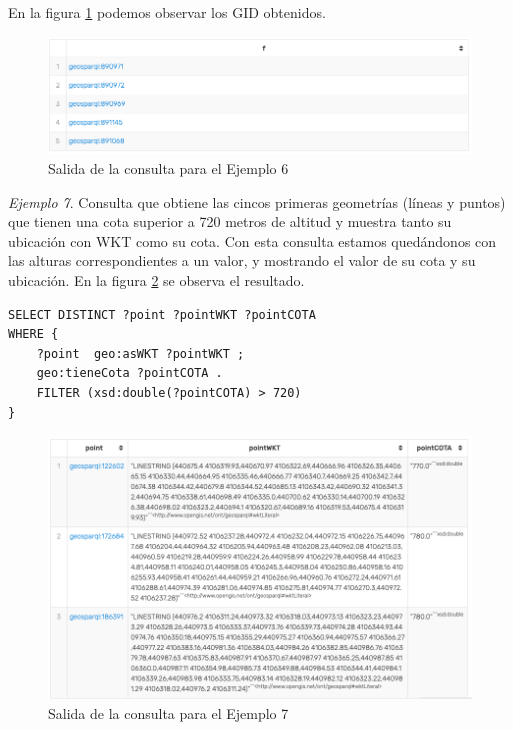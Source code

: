 En la figura \ref{fig:salida4} podemos observar los GID obtenidos.

\begin{figure}[H]
	\centering
	\includegraphics[width=1\linewidth]{imagenes/capitulo5/salida4}
	\caption{Salida de la consulta para el Ejemplo 6}
	\label{fig:salida4}
\end{figure}

\textit{Ejemplo 7}. Consulta que obtiene las cincos primeras geometrías (líneas y puntos) que tienen una cota superior a 720 metros de altitud y muestra tanto su ubicación con WKT como su cota. Con esta consulta estamos quedándonos con las alturas correspondientes a un valor, y mostrando el valor de su cota y su ubicación. En la figura \ref{fig:salida6} se observa el resultado.


\vspace*{0.2cm}

\begin{lstlisting}
SELECT DISTINCT ?point ?pointWKT ?pointCOTA
WHERE {
	?point 	geo:asWKT ?pointWKT ;
	geo:tieneCota ?pointCOTA .
	FILTER (xsd:double(?pointCOTA) > 720)
}
\end{lstlisting}


\begin{figure}[H]
	\centering
	\includegraphics[width=1\linewidth]{imagenes/capitulo5/salida6}
	\caption{Salida de la consulta para el Ejemplo 7}
	\label{fig:salida6}
\end{figure}



